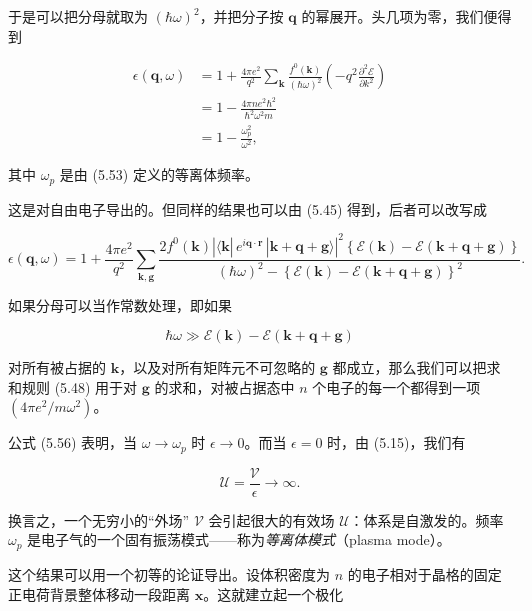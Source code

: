 于是可以把分母就取为 $(\hbar\omega)^2$，并把分子按 $\mathbf{q}$ 的幂展开。头几项为零，我们便得到

\begin{align*}
\epsilon(\mathbf{q},\omega) &= 1 + \frac{4\pi e^2}{q^2} \sum_{\mathbf{k}} \frac{f^0(\mathbf{k})}{(\hbar\omega)^2} \left( -q^2 \frac{\partial^2 \mathcal{E}}{\partial k^2} \right) \\
&= 1 - \frac{4\pi n e^2 \hbar^2}{\hbar^2 \omega^2 m} \\
&= 1 - \frac{\omega_p^2}{\omega^2} ,
\tag{5.56}
\end{align*}

其中 $\omega_p$ 是由 (5.53) 定义的等离体频率。

这是对自由电子导出的。但同样的结果也可以由 (5.45) 得到，后者可以改写成

\begin{equation*}
\epsilon(\mathbf{q},\omega) = 1 + \frac{4\pi e^2}{q^2} \sum_{\mathbf{k},\mathbf{g}} \frac{2f^0(\mathbf{k}) \left| \langle \mathbf{k}|\, e^{i\mathbf{q}\cdot\mathbf{r}}\, |\mathbf{k}+\mathbf{q}+\mathbf{g}\rangle \right|^2 \left\{ \mathcal{E}(\mathbf{k}) - \mathcal{E}(\mathbf{k}+\mathbf{q}+\mathbf{g}) \right\}}{(\hbar\omega)^2 - \left\{ \mathcal{E}(\mathbf{k}) - \mathcal{E}(\mathbf{k}+\mathbf{q}+\mathbf{g}) \right\}^2} .
\tag{5.57}
\end{equation*}

如果分母可以当作常数处理，即如果

\begin{equation*}
\hbar\omega \gg \mathcal{E}(\mathbf{k}) - \mathcal{E}(\mathbf{k}+\mathbf{q}+\mathbf{g})
\tag{5.58}
\end{equation*}

对所有被占据的 $\mathbf{k}$，以及对所有矩阵元不可忽略的 $\mathbf{g}$ 都成立，那么我们可以把求和规则 (5.48) 用于对 $\mathbf{g}$ 的求和，对被占据态中 $n$ 个电子的每一个都得到一项 $(4\pi e^2/m\omega^2)$。

公式 (5.56) 表明，当 $\omega \to \omega_p$ 时 $\epsilon \to 0$。而当 $\epsilon = 0$ 时，由 (5.15)，我们有

\begin{equation*}
\mathcal{U} = \frac{\mathcal{V}}{\epsilon} \to \infty .
\tag{5.59}
\end{equation*}

换言之，一个无穷小的“外场” $\mathcal{V}$ 会引起很大的有效场 $\mathcal{U}$：体系是自激发的。频率 $\omega_p$ 是电子气的一个固有振荡模式——称为\emph{等离体模式}（plasma mode）。

这个结果可以用一个初等的论证导出。设体积密度为 $n$ 的电子相对于晶格的固定正电荷背景整体移动一段距离 $\mathbf{x}$。这就建立起一个极化

